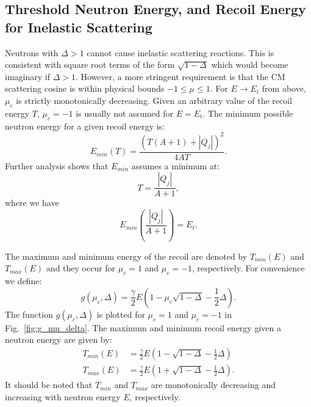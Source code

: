\documentclass[review]{elsarticle}
\begin{document}
\subsection{Threshold Neutron Energy, and Recoil Energy for Inelastic Scattering}
Neutrons with $\Delta > 1$ cannot cause inelastic scattering reactions. This is consistent with square root terms of the form $\sqrt{1 - \Delta}$ which would become imaginary if $\Delta > 1$. However, a more stringent requirement is that the CM scattering cosine is within physical bounds $-1 \le \mu \le 1$. For $E \rightarrow E_t$ from above, $\mu_c$ is strictly monotonically decreasing. Given an arbitrary value of the recoil energy $T$, $\mu_c=-1$ is usually not assumed for $E = E_t$. The minimum possible neutron energy for a given recoil energy is:
\begin{equation}\label{eq:E_min}
   E_{min}(T) = \frac{\left(T (A+1) + \left |Q_j \right|  \right)^2}{4 A T}. 
\end{equation}
Further analysis shows that $E_{min}$ assumes a minimum at:
\begin{equation}
   T = \frac{\left| Q_j \right|}{A+1},
\end{equation}
where we have
\begin{equation}
  E_{min}(\frac{\left| Q_j \right|}{A+1}) = E_t.
\end{equation}

The maximum and minimum energy of the recoil are denoted by $T_{min}(E)$ and $T_{max}(E)$ and they occur for $\mu_{c} = 1$ and $\mu_c=-1$, respectively. 
For convenience we define:
\begin{equation}
   g(\mu_c, \Delta) = \frac{\gamma}{2} E \left( 1 -\mu_c  \sqrt{1 - \Delta} - \frac{1}{2} \Delta  \right).
\end{equation}
The function $g(\mu_c, \Delta)$ is plotted for $\mu_c=1$ and $\mu_c=-1$ in Fig.~\ref{fig:g_mu_delta}.
The maximum and minimum recoil energy given a neutron energy are given by:
\begin{align}\label{eq:T_min_max}
  T_{min}(E) &=  \frac{\gamma}{2} E \left (  1 - \sqrt{1 - \Delta} - \frac{1}{2} \Delta \right ) \nonumber \\
  T_{max}(E) &=  \frac{\gamma}{2} E \left (  1 + \sqrt{1 - \Delta} - \frac{1}{2} \Delta \right ).
\end{align}
It should be noted that $T_{min}$ and $T_{max}$ are monotonically decreasing and increasing with neutron energy $E$, respectively. 
\end{document}
